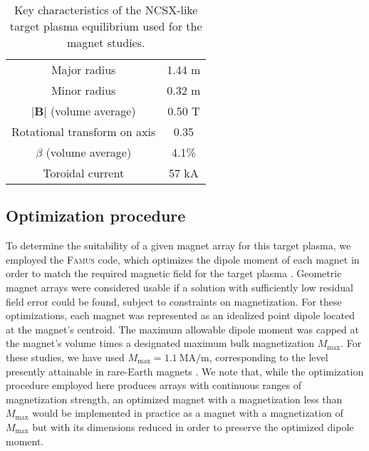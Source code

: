 \documentclass[11pt,onecolumn]{article}
\begin{document}
\begin{table}
    \begin{center}
    \begin{tabular}{|c|c|}
    \hline
    Major radius                      & 1.44 m  \\
    Minor radius                      & 0.32 m  \\
    $|\mathbf{B}|$ (volume average)   & 0.50 T  \\
    Rotational transform on axis      & 0.35    \\
    $\beta$ (volume average)          & 4.1\%   \\
    Toroidal current                  & 57 kA   \\
    \hline
    \end{tabular}
    \caption{Key characteristics of the NCSX-like target plasma equilibrium
             used for the magnet studies.}
    \label{tab:ncsx}
    \end{center}
\end{table}

\subsection{Optimization procedure}
\label{ssect:optimization}

To determine the suitability of a given magnet array for this target plasma,
we employed the \textsc{Famus} code, which optimizes the dipole moment of each
magnet in order to match the required magnetic field for the target 
plasma \cite{zhu2020b}. Geometric magnet arrays were considered usable if
a solution with sufficiently low residual field error could be found, subject
to constraints on magnetization. For these optimizations, each
magnet was represented as an idealized point dipole located at the magnet's
centroid. The maximum allowable dipole moment was capped
at the magnet's volume times a designated maximum bulk magnetization 
$M_\text{max}$. For these studies, we have used 
$M_\text{max}=1.1~\text{MA}/\text{m}$, corresponding to the level presently
attainable in rare-Earth magnets \cite{benabderrahmane2012a}.
We note that, while the optimization procedure employed here produces
arrays with continuous ranges of magnetization strength, 
an optimized magnet with a magnetization less than $M_\text{max}$ would
be implemented in practice as a magnet with a magnetization of $M_\text{max}$
but with its dimensions reduced in order to preserve the optimized dipole 
moment.
\end{document}
